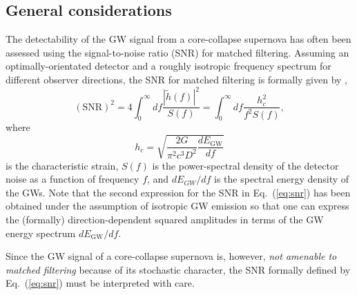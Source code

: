 \subsection{General considerations}
The detectability of the GW signal from a core-collapse supernova has
often been assessed using the signal-to-noise ratio (SNR) for matched
filtering. Assuming an optimally-orientated detector and a roughly
isotropic frequency spectrum for different observer directions, the
SNR for matched filtering is formally given by \citep[][cp.\ their Eq.~(5.2) for the second form]{flanagan_98a},
\begin{equation}
\label{eq:snr}
(\mathrm{SNR})^2
=
4 \int_0^\infty df \frac{|\tilde{h}(f)|^2}{S(f)}
=
\int_0^{\infty} df \frac{h_c ^2}{f^2 S(f)},
\end{equation}
where
\begin{equation}
\label{eq:h_c}
h_c =\sqrt{ \frac{2 G}{\pi^2 c^3 D^2} \frac{d E_\mathrm{GW}}{df}}
\end{equation}
is the characteristic strain, $S(f)$ is the power-spectral density of the detector noise as a
function of frequency $f$, and $d E_{GW}/df$ is the spectral energy density of the GWs.
Note that the second expression for the SNR in Eq.~(\ref{eq:snr})
has been obtained under the assumption of isotropic GW emission so that
one can express the (formally) direction-dependent squared
amplitudes in terms of the GW energy spectrum $d E_\mathrm{GW}/df$.

Since the GW signal of a core-collapse supernova is,
however, \emph{not amenable to matched filtering} because of its
stochastic character, the SNR formally defined by
Eq.~(\ref{eq:snr}) must be interpreted with care. 

